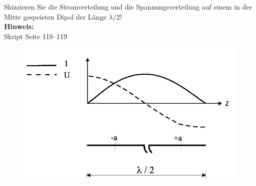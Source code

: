 \begin{question}[section=11,name={Strom-/Spannungsverteilung auf Dipol},difficulty=,quantity=6,type=thr,tags={20151210}]
	Skizzieren Sie die Stromverteilung und die Spannungsverteilung auf einem in der Mitte gespeisten Dipol der Länge $\lambda/2$!
	\\ \textbf{Hinweis:}\\
	Skript Seite 118--119
\end{question}
\begin{solution}
	\begin{figure}[H]
		\includegraphics[width=14cm]{./opn/exm/thr/chp/11/4/bild.jpeg}
	\end{figure}
\end{solution}